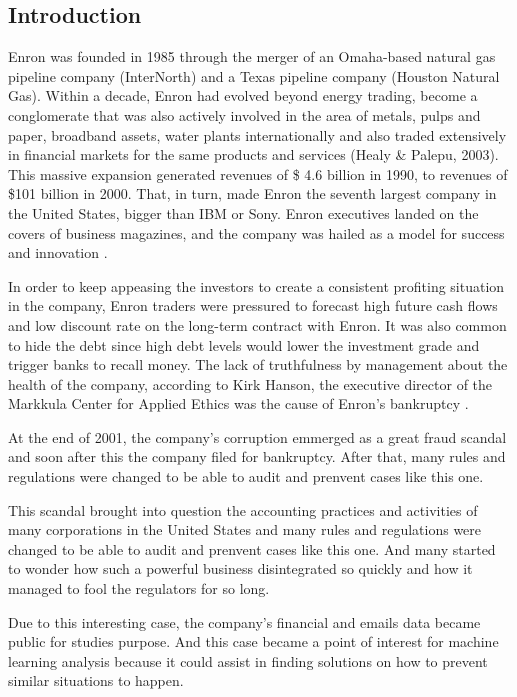 \documentclass[11pt]{article}
\begin{document}
\begin{multicols}{2}

\section{Introduction}\label{introduction}

Enron was founded in 1985 through the merger of an Omaha-based natural
gas pipeline company (InterNorth) and a Texas pipeline company (Houston
Natural Gas). Within a decade, Enron had evolved beyond energy trading,
become a conglomerate that was also actively involved in the area of
metals, pulps and paper, broadband assets, water plants internationally
and also traded extensively in financial markets for the same products
and services (Healy \& Palepu, 2003). This massive expansion generated
revenues of \$ 4.6 billion in 1990, to revenues of \$101 billion in
2000. That, in turn, made Enron the seventh largest company in the
United States, bigger than IBM or Sony. Enron executives landed on the
covers of business magazines, and the company was hailed as a model for
success and innovation \cite{davis2007social}.

In order to keep appeasing the investors to create a consistent
profiting situation in the company, Enron traders were pressured to
forecast high future cash flows and low discount rate on the long-term
contract with Enron. It was also common to hide the debt since high debt
levels would lower the investment grade and trigger banks to recall
money. The lack of truthfulness by management about the health of the
company, according to Kirk Hanson, the executive director of the
Markkula Center for Applied Ethics was the cause of Enron's bankruptcy
\cite{li2010case}.

At the end of 2001, the company's corruption emmerged as a great fraud
scandal and soon after this the company filed for bankruptcy. After
that, many rules and regulations were changed to be able to audit and
prenvent cases like this one.

This scandal brought into question the accounting practices and
activities of many corporations in the United States and many rules and
regulations were changed to be able to audit and prenvent cases like
this one. And many started to wonder how such a powerful business
disintegrated so quickly and how it managed to fool the regulators for
so long.

Due to this interesting case, the company's financial and emails data
became public for studies purpose. And this case became a point of
interest for machine learning analysis because it could assist in
finding solutions on how to prevent similar situations to happen.


\end{multicols}
\end{document}
